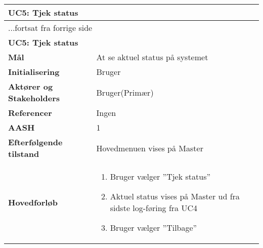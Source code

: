 \begin{center} \centering \label{UC5}
	\begin{longtable}{|p{5cm}|p{9cm}|}  %
	\hline
		\multicolumn{2}{|l|}{\textbf{UC5: Tjek status}} \\\hline %
		\endfirsthead
		
		\multicolumn{2}{l}{...fortsat fra forrige side} \\ \hline %
		\multicolumn{2}{|l|}{\textbf{UC5: Tjek status}} \\\hline %
		\endhead	
		
		\textbf{Mål}								&At se aktuel status på systemet			\\\hline
		\textbf{Initialisering}					&Bruger							\\\hline
		\textbf{Aktører og Stakeholders}			&Bruger(Primær)					\\\hline
		\textbf{Referencer}						&Ingen							\\\hline
		\textbf{AASH}							&1								\\\hline
		\textbf{Efterfølgende tilstand}			&Hovedmenuen vises på Master			\\\hline
		\textbf{Hovedforløb}					
			&\begin{enumerate}
	
				\item Bruger vælger ''Tjek status''
				
				\item Aktuel status vises på Master ud fra sidste log-føring fra UC4
				
				\item Bruger vælger ''Tilbage''
	
			\end{enumerate}\\\hline
	\end{longtable} 
\end{center}

